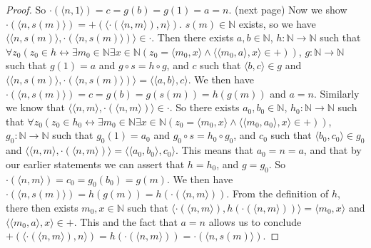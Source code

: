 \documentclass{report}
\begin{document}
\begin{proof}
So $\cdot(\langle n,1\rangle)=c=g(b)=g(1)=a=n$.
(next page)\newpage
Now we show $\cdot(\langle n,s(m)\rangle)=+(\langle\cdot(\langle n,m\rangle),n\rangle)$.
$s(m)\in\mathbb N$ exists, so we have $\langle\langle n,s(m)\rangle,\cdot(\langle n,s(m)\rangle)\rangle\in\cdot$. Then there exists $a,b\in\mathbb N$, $h:\mathbb N\to\mathbb N$ such that 
$\forall z_0(z_0\in h\leftrightarrow\exists m_0\in\mathbb N\exists x\in\mathbb N(z_0=\langle m_0,x\rangle\land\langle\langle m_0,a\rangle,x\rangle\in+))$, $g:\mathbb N\to\mathbb N$ such that 
$g(1)=a$ and $g\circ s=h\circ g$, and $c$ such that $\langle b,c\rangle\in g$ and 
$\langle\langle n,s(m)\rangle,\cdot(\langle n,s(m)\rangle)\rangle=\langle\langle a,b\rangle,c\rangle$.
We then have $\cdot(\langle n,s(m)\rangle)=c=g(b)=g(s(m))=h(g(m))$ and $a=n$. Similarly we know that $\langle\langle n,m\rangle,\cdot(\langle n,m\rangle)\rangle\in\cdot$.
So there exists $a_0,b_0\in\mathbb N$, $h_0:\mathbb N\to\mathbb N$ such that 
$\forall z_0(z_0\in h_0\leftrightarrow\exists m_0\in\mathbb N\exists x\in\mathbb N(z_0=\langle m_0,x\rangle\land\langle\langle m_0,a_0\rangle,x\rangle\in+))$,
$g_0:\mathbb N\to\mathbb N$ such that $g_0(1)=a_0$ and $g_0\circ s=h_0\circ g_0$, and $c_0$ such 
that $\langle b_0,c_0\rangle\in g_0$ and $\langle\langle n,m\rangle,\cdot(\langle n,m\rangle)\rangle=\langle\langle a_0,b_0\rangle,c_0\rangle$.
This means that $a_0=n=a$, and that by our earlier statements we can assert that $h=h_0$, and $g=g_0$. So $\cdot(\langle n,m\rangle)=c_0=g_0(b_0)=g(m)$. We then have
$\cdot(\langle n,s(m)\rangle)=h(g(m))=h(\cdot(\langle n,m\rangle))$. From the definition of $h$, there then exists $m_0,x\in\mathbb N$ such that
$\langle\cdot(\langle n,m\rangle),h(\cdot(\langle n,m\rangle))\rangle=\langle m_0,x\rangle$ and
$\langle\langle m_0,a\rangle,x\rangle\in+$. This and the fact that $a=n$ allows us to conclude
$+(\langle\cdot(\langle n,m\rangle),n\rangle)=h(\cdot(\langle n,m\rangle))=\cdot(\langle n,s(m)\rangle)$.
\end{proof}
\end{document}
